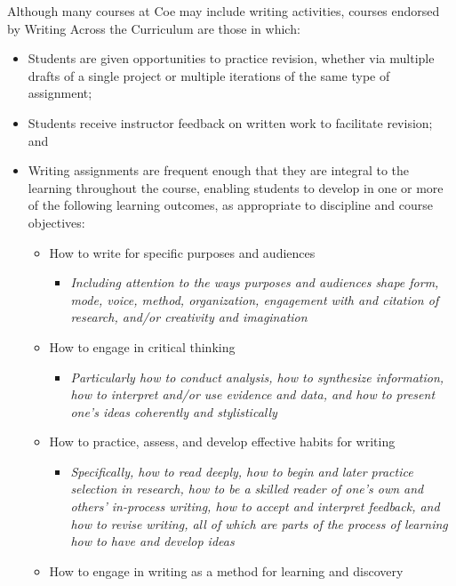 \documentclass[
  letterpaper,
]{scrbook}
\providecommand{\tightlist}{%
  \setlength{\itemsep}{0pt}\setlength{\parskip}{0pt}}
\begin{document}
Although many courses at Coe may include writing activities, courses
endorsed by Writing Across the Curriculum are those in which:

\begin{itemize}
\tightlist
\item
  Students are given opportunities to practice revision, whether via
  multiple drafts of a single project or multiple iterations of the same
  type of assignment;
\item
  Students receive instructor feedback on written work to facilitate
  revision; and
\item
  Writing assignments are frequent enough that they are integral to the
  learning throughout the course, enabling students to develop in one or
  more of the following learning outcomes, as appropriate to discipline
  and course objectives:

  \begin{itemize}
  \tightlist
  \item
    How to write for specific purposes and audiences

    \begin{itemize}
    \tightlist
    \item
      \emph{Including attention to the ways purposes and audiences shape
      form, mode, voice, method, organization, engagement with and
      citation of research, and/or creativity and imagination}
    \end{itemize}
  \item
    How to engage in critical thinking

    \begin{itemize}
    \tightlist
    \item
      \emph{Particularly how to conduct analysis, how to synthesize
      information, how to interpret and/or use evidence and data, and
      how to present one's ideas coherently and stylistically}
    \end{itemize}
  \item
    How to practice, assess, and develop effective habits for writing

    \begin{itemize}
    \tightlist
    \item
      \emph{Specifically, how to read deeply, how to begin and later
      practice selection in research, how to be a skilled reader of
      one's own and others' in-process writing, how to accept and
      interpret feedback, and how to revise writing, all of which are
      parts of the process of learning how to have and develop ideas}
    \end{itemize}
  \item
    How to engage in writing as a method for learning and discovery


\end{itemize}
\end{itemize}
\end{document}
